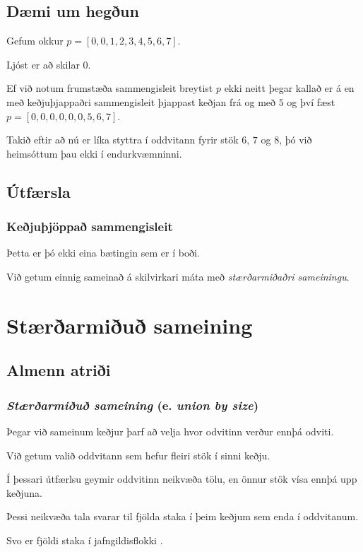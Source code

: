\subsection{Dæmi um hegðun}
{
    {
        \item<1-> Gefum okkur
            $p = [0, 0, 1, 2, 3, 4, 5, 6, 7]$.
        \item<2-> Ljóst er að  skilar $0$.
        \item<3-> Ef við notum frumstæða sammengisleit breytist $p$ ekki neitt þegar kallað er á 
            en með keðjuþjappaðri sammengisleit þjappast keðjan frá og með $5$ og því fæst
            $p = [0, 0, 0, 0, 0, 0, 5, 6, 7]$.
        \item<4-> Takið eftir að nú er líka styttra í oddvitann fyrir stök $6$, $7$ og $8$, þó við heimsóttum þau ekki í endurkvæmninni.
    }
}

\subsection{Útfærsla}
{
    \frametitle{Keðjuþjöppað sammengisleit}
}

{
    {
        \item<1-> Þetta er þó ekki eina bætingin sem er í boði.
        \item<2-> Við getum einnig sameinað á skilvirkari máta með \emph{stærðarmiðaðri sameiningu}.
    }
}

\section{Stærðarmiðuð sameining}
\subsection{Almenn atriði}
{
    \frametitle{\emph{Stærðarmiðuð sameining} (e. \emph{union by size})}
    {
        \item<1-> Þegar við sameinum keðjur þarf að velja hvor odvitinn verður ennþá odviti.
        \item<2-> Við getum valið oddvitann sem hefur fleiri stök í sinni keðju.
        \item<3->[] 
        \item<4-> Í þessari útfærlsu geymir oddvitinn neikvæða tölu, en önnur stök vísa ennþá upp keðjuna.
        \item<5-> Þessi neikvæða tala svarar til fjölda staka í þeim keðjum sem enda í oddvitanum.
        \item<6-> Svo  er fjöldi staka í jafngildisflokki .
    }
}

